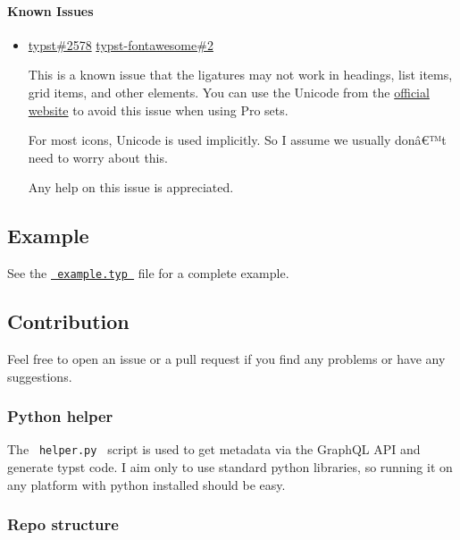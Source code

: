 \paragraph{Known Issues}\label{known-issues}

\begin{itemize}
\item
  \href{https://github.com/typst/typst/issues/2578}{typst\#2578}
  \href{https://github.com/duskmoon314/typst-fontawesome/issues/2}{typst-fontawesome\#2}

  This is a known issue that the ligatures may not work in headings,
  list items, grid items, and other elements. You can use the Unicode
  from the \href{https://fontawesome.com/}{official website} to avoid
  this issue when using Pro sets.

  For most icons, Unicode is used implicitly. So I assume we usually
  donâ€™t need to worry about this.

  Any help on this issue is appreciated.
\end{itemize}

\subsection{Example}\label{example}

See the
\href{https://typst.app/project/rQwGUWt5p33vrsb_uNPR9F}{\texttt{\ example.typ\ }}
file for a complete example.

\subsection{Contribution}\label{contribution}

Feel free to open an issue or a pull request if you find any problems or
have any suggestions.

\subsubsection{Python helper}\label{python-helper}

The \texttt{\ helper.py\ } script is used to get metadata via the
GraphQL API and generate typst code. I aim only to use standard python
libraries, so running it on any platform with python installed should be
easy.

\subsubsection{Repo structure}\label{repo-structure}

